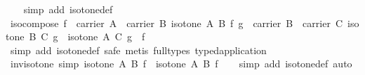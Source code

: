 \begin{isabellebody}
%
\isadelimproof
\ \ %
\endisadelimproof
%
\isatagproof
{}\isamarkupfalse%
\ {}simp\ add{}\ isotone{}def{}%
\endisatagproof
{\isafoldproof}%
%
\isadelimproof
\isanewline
%
\endisadelimproof
\isanewline
{}\isamarkupfalse%
\ iso{}compose{}\ {}{}f\ {}\ carrier\ A\ {}\ carrier\ B{}\ isotone\ A\ B\ f{}\ g\ {}\ carrier\ B\ {}\ carrier\ C{}\ isotone\ B\ C\ g{}\ {}\ isotone\ A\ C\ {}g\ {}\ f{}{}\isanewline
%
\isadelimproof
\ \ %
\endisadelimproof
%
\isatagproof
{}\isamarkupfalse%
\ {}simp\ add{}\ isotone{}def{}\ safe{}\ metis\ {}full{}types{}\ typed{}application{}%
\endisatagproof
{\isafoldproof}%
%
\isadelimproof
\isanewline
%
\endisadelimproof
\isanewline
{}\isamarkupfalse%
\ inv{}isotone\ {}simp{}{}\ {}isotone\ {}A{}{}\ {}B{}{}\ f\ {}\ isotone\ A\ B\ f{}\isanewline
%
\isadelimproof
\ \ %
\endisadelimproof
%
\isatagproof
{}\isamarkupfalse%
\ {}simp\ add{}\ isotone{}def{}\ auto{}%

\end{isabellebody}
